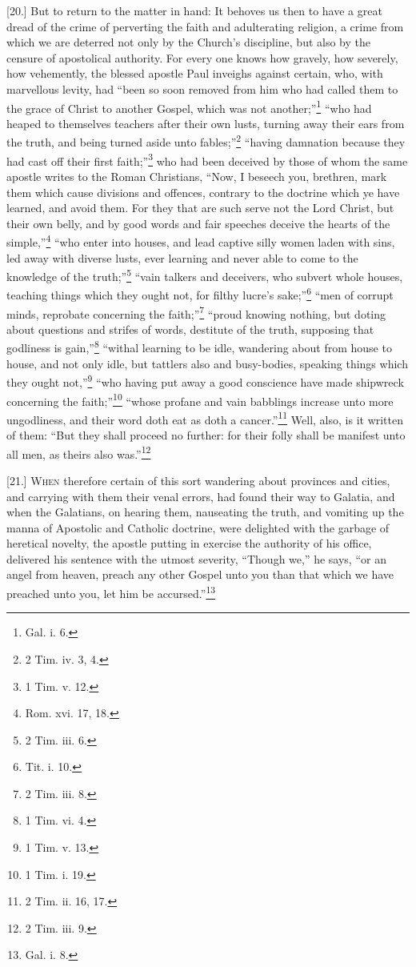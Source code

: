 [20.] But to return to the matter in hand: It behoves us then to have a great dread of the crime of perverting the faith and adulterating religion, a crime from which we are deterred not only by the Church’s discipline, but also by the censure of apostolical authority. For every one knows how gravely, how severely, how vehemently, the blessed apostle Paul inveighs against certain, who, with marvellous levity, had “been so soon removed from him who had called them to the grace of Christ to another Gospel, which was not another;”\footnote{Gal. i. 6.} “who had heaped to themselves teachers after their own lusts, turning away their ears from the truth, and being turned aside unto fables;”\footnote{2 Tim. iv. 3, 4.} “having damnation because they had cast off their first faith;”\footnote{1 Tim. v. 12.} who had been deceived by those of whom the same apostle writes to the Roman Christians, “Now, I beseech you, brethren, mark them which cause divisions and offences, contrary to the doctrine which ye have learned, and avoid them. For they that are such serve not the Lord Christ, but their own belly, and by good words and fair speeches deceive the hearts of the simple,”\footnote{Rom. xvi. 17, 18.} “who enter into houses, and lead captive silly women laden with sins, led away with diverse lusts, ever learning and never able to come to the knowledge of the truth;”\footnote{2 Tim. iii. 6.} “vain talkers and deceivers, who subvert whole houses, teaching things which they ought not, for filthy lucre’s sake;”\footnote{Tit. i. 10.} “men of corrupt minds, reprobate concerning the faith;”\footnote{2 Tim. iii. 8.} “proud knowing nothing, but doting about questions and strifes of words, destitute of the truth, supposing that godliness is gain,”\footnote{1 Tim. vi. 4.} “withal learning to be idle, wandering about from house to house, and not only idle, but tattlers also and busy-bodies, speaking things which they ought not,”\footnote{1 Tim. v. 13.} “who having put away a good conscience have made shipwreck concerning the faith;”\footnote{1 Tim. i. 19.} “whose profane and vain babblings increase unto more ungodliness, and their word doth eat as doth a cancer.”\footnote{2 Tim. ii. 16, 17.} Well, also, is it written of them: “But they shall proceed no further: for their folly shall be manifest unto all men, as theirs also was.”\footnote{2 Tim. iii. 9.}


[21.] \textsc{When} therefore certain of this sort wandering about provinces and cities, and carrying with them their venal errors, had found their way to Galatia, and when the Galatians, on hearing them, nauseating the truth, and vomiting up the manna of Apostolic and Catholic doctrine, were delighted with the garbage of heretical novelty, the apostle putting in exercise the authority of his office, delivered his sentence with the utmost severity, “Though we,” he says, “or an angel from heaven, preach any other Gospel unto you than that which we have preached unto you, let him be accursed.”\footnote{Gal. i. 8.}

